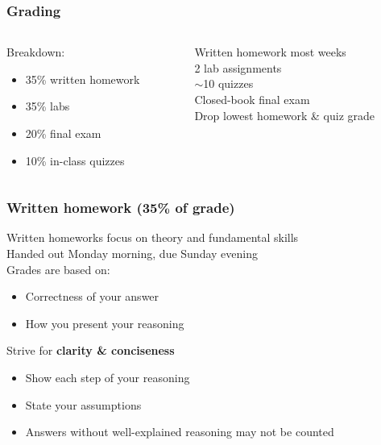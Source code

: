 \documentclass[10pt]{beamer}
\begin{document}
\begin{frame}

\frametitle{Grading}

\begin{columns}
\begin{column}{0.45\textwidth}
Breakdown:
\begin{itemize}
  \item 35\% written homework
  \item 35\% labs
  \item 20\% final exam
  \item 10\% in-class quizzes\\[1em]
\end{itemize}
\end{column}

\begin{column}{0.55\textwidth}

Written homework most weeks
\\[1em]

2 lab assignments
\\[1em]

${\displaystyle\sim}$10 quizzes
\\[1em]

Closed-book final exam
\\[1em]

Drop lowest homework \& quiz grade

\end{column}

\end{columns}

\end{frame}


\begin{frame}

\frametitle{Written homework (35\% of grade)}

Written homeworks focus on theory and fundamental skills
\\[1em]

Handed out Monday morning, due Sunday evening
\\[1em]

Grades are based on:
\begin{itemize}
\item Correctness of your answer
\item How you present your reasoning\\[1em]
\end{itemize}

Strive for \textbf{clarity \& conciseness}
\begin{itemize}
\item Show each step of your reasoning
\item State your assumptions
\item Answers without well-explained reasoning may not be counted
\end{itemize}

\end{frame}
\end{document}

